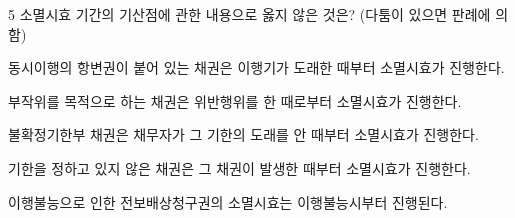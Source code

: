 \begin{question}{5}
소멸시효 기간의 기산점에 관한 내용으로 옳지 않은 것은? (다툼이 있으면 판례에 의함)
\begin{choices}
  \item 동시이행의 항변권이 붙어 있는 채권은 이행기가 도래한 때부터 소멸시효가 진행한다.
  \item 부작위를 목적으로 하는 채권은 위반행위를 한 때로부터 소멸시효가 진행한다.
  \item 불확정기한부 채권은 채무자가 그 기한의 도래를 안 때부터 소멸시효가 진행한다.
  \item 기한을 정하고 있지 않은 채권은 그 채권이 발생한 때부터 소멸시효가 진행한다.
  \item 이행불능으로 인한 전보배상청구권의 소멸시효는 이행불능시부터 진행된다.
\end{choices}
\end{question}
